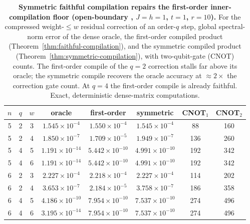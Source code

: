 \begin{table}[t]
\caption{\textbf{Symmetric faithful compilation repairs the first-order inner-compilation floor (open-boundary \tfim{}, $J=h=1$, $t=1$, $r=10$).} For the compressed weight-$\le w$ residual correction of an order-$q$ step, global spectral-norm error of the dense oracle, the first-order compiled product (Theorem~\ref{thm:faithful-compilation}), and the symmetric compiled product (Theorem~\ref{thm:symmetric-compilation}), with two-qubit-gate (CNOT) counts. The first-order compile of the $q=2$ correction stalls far above its oracle; the symmetric compile recovers the oracle accuracy at $\approx2\times$ the correction gate count. At $q=4$ the first-order compile is already faithful. Exact, deterministic dense-matrix computations.}
\label{tab:faithful-compilation}
\centering
\begin{tabular}{cccccccc}
\toprule
$n$ & $q$ & $w$ & oracle & first-order & symmetric & CNOT$_1$ & CNOT$_2$\\
\midrule
5 & 2 & 3 & $1.545\times10^{-4}$ & $1.550\times10^{-4}$ & $1.545\times10^{-4}$ & 88 & 160\\
5 & 2 & 4 & $1.850\times10^{-7}$ & $1.709\times10^{-5}$ & $1.949\times10^{-7}$ & 136 & 260\\
5 & 4 & 5 & $1.191\times10^{-14}$ & $5.442\times10^{-10}$ & $4.991\times10^{-10}$ & 192 & 342\\
5 & 4 & 6 & $1.191\times10^{-14}$ & $5.442\times10^{-10}$ & $4.991\times10^{-10}$ & 192 & 342\\
6 & 2 & 3 & $2.227\times10^{-4}$ & $2.218\times10^{-4}$ & $2.227\times10^{-4}$ & 114 & 202\\
6 & 2 & 4 & $3.653\times10^{-7}$ & $2.184\times10^{-5}$ & $3.758\times10^{-7}$ & 186 & 358\\
6 & 4 & 5 & $4.186\times10^{-10}$ & $7.954\times10^{-10}$ & $7.537\times10^{-10}$ & 274 & 496\\
6 & 4 & 6 & $3.195\times10^{-14}$ & $7.954\times10^{-10}$ & $7.537\times10^{-10}$ & 274 & 496\\
\bottomrule
\end{tabular}
\end{table}
